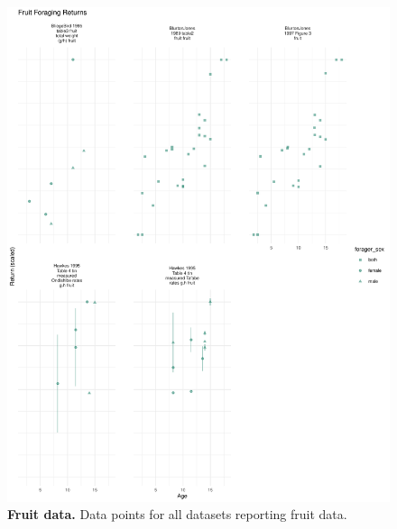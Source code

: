\begin{figure}[h]
\centering
\includegraphics[width=12cm] {text/images/Figure_S9.pdf}
\renewcommand{\thefigure}{S\arabic{figure}}
\caption{\textbf{Fruit data.} Data points for all datasets reporting fruit data.}
\label{fig:fruit}
\end{figure}

